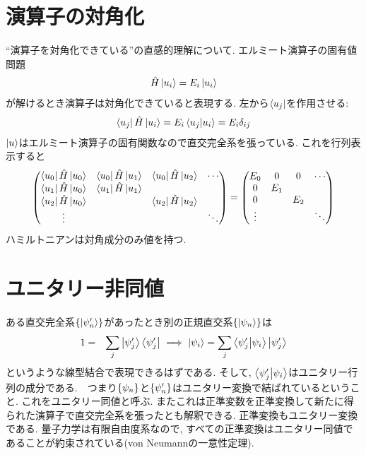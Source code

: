 \documentclass[10.5pt,a4paper]{jreport}
\begin{document}
\section{演算子の対角化}
``演算子を対角化できている''の直感的理解について. エルミート演算子の固有値問題
\begin{eqnarray}
  \hat{H}\ket{u_i} = E_i\ket{u_i}
\end{eqnarray}
が解けるとき演算子は対角化できていると表現する. 左から$\bra{u_j}$を作用させる:
\begin{eqnarray}
  \bra{u_j}\hat{H}\ket{u_i} = E_i\bra{u_j}\ket{u_i} = E_i\delta_{ij}
\end{eqnarray}
$\ket{u}$はエルミート演算子の固有関数なので直交完全系を張っている. これを行列表示すると
\begin{eqnarray}
  \begin{pmatrix}
    \bra{u_0}\hat{H}\ket{u_0}&\bra{u_0}\hat{H}\ket{u_1}&\bra{u_0}\hat{H}\ket{u_2}&\cdots\\
    \bra{u_1}\hat{H}\ket{u_0}&\bra{u_1}\hat{H}\ket{u_1}&&\\
    \bra{u_2}\hat{H}\ket{u_0}&&\bra{u_2}\hat{H}\ket{u_2}&\\
    \vdots&&&\ddots
  \end{pmatrix}
  =
    \begin{pmatrix}
    E_0&0&0&\cdots\\
    0&E_1&&\\
    0&&E_2&\\
    \vdots&&&\ddots
  \end{pmatrix}
\end{eqnarray}
ハミルトニアンは対角成分のみ値を持つ.
\section{ユニタリー非同値}
ある直交完全系$\{\ket{\psi'_n}\}$があったとき別の正規直交系$\{\ket{\psi_n}\}$は
\begin{eqnarray}
  1 &=& \sum_j\ket{\psi'_j}\bra{\psi'_j}\ \Longrightarrow\ \ket{\psi_i} = \sum_j \bra{\psi'_j}\ket{\psi_i}\ket{\psi'_j}
\end{eqnarray}
というような線型結合で表現できるはずである. そして, $\bra{\psi'_j}\ket{\psi_i}$はユニタリー行列の成分である.　つまり$\qty{\psi_n}$と$\qty{\psi'_n}$はユニタリー変換で結ばれているということ. これをユニタリー同値と呼ぶ. またこれは正準変数を正準変換して新たに得られた演算子で直交完全系を張ったとも解釈できる. 正準変換もユニタリー変換である. 量子力学は有限自由度系なので, すべての正準変換はユニタリー同値であることが約束されている(von Neumannの一意性定理).
\end{document}

